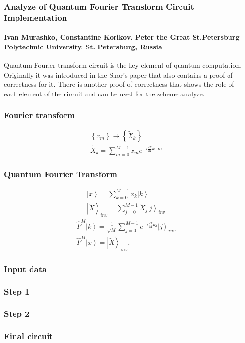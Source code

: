 \documentclass{beamer}
\begin{document}
\begin{frame}
  \frametitle{Analyze of Quantum Fourier Transform Circuit Implementation}
  \framesubtitle{Ivan Murashko, Constantine Korikov. Peter the Great
    St.Petersburg Polytechnic University, St. Petersburg, Russia}

  Quantum Fourier transform circuit is the key element of quantum
  computation. Originally it was introduced in the Shor's paper
  that also contains a proof of correctness for it. There
  is another proof of correctness that shows the role of each element
  of the circuit and can be used for the scheme analyze. 

\end{frame}

\begin{frame}
  \frametitle{Fourier transform}  
  \begin{eqnarray}
    \left\{x_m\right\} \rightarrow \left\{\tilde{X}_k\right\}
    \nonumber \\
    \tilde{X}_k = \sum^{M - 1}_{m = 0} x_m e^{-i \frac{2 \pi}{M} k\cdot m}
    \nonumber
  \end{eqnarray}
\end{frame}

\begin{frame}
  \frametitle{Quantum Fourier Transform}
  \begin{eqnarray}
    \left|x\right> = \sum_{k = 0}^{M - 1}x_k \left|k\right>
    \nonumber \\
    \left|\tilde{X}\right>_{inv} = \sum_{j = 0}^{M - 1}
    \tilde{X}_j\left|j\right>_{inv}
    \nonumber
  \end{eqnarray}
  \begin{eqnarray}
    \hat{F}^{M}\left|k\right> = \frac{1}{\sqrt{M}}\sum_{j = 0}^{M -1}
    e^{-i \frac{2 \pi}{M} k j}\left|j\right>_{inv}
    \nonumber \\
    \hat{F}^{M} \left|x\right> = \left|\tilde{X}\right>_{inv},
    \nonumber
  \end{eqnarray}
\end{frame}

\begin{frame}
  \frametitle{Input data}
  
\end{frame}

\begin{frame}
  \frametitle{Step 1}
  
\end{frame}

\begin{frame}
  \frametitle{Step 2}
  
\end{frame}

\begin{frame}
  \frametitle{Final circuit}
  
\end{frame}
\end{document}
